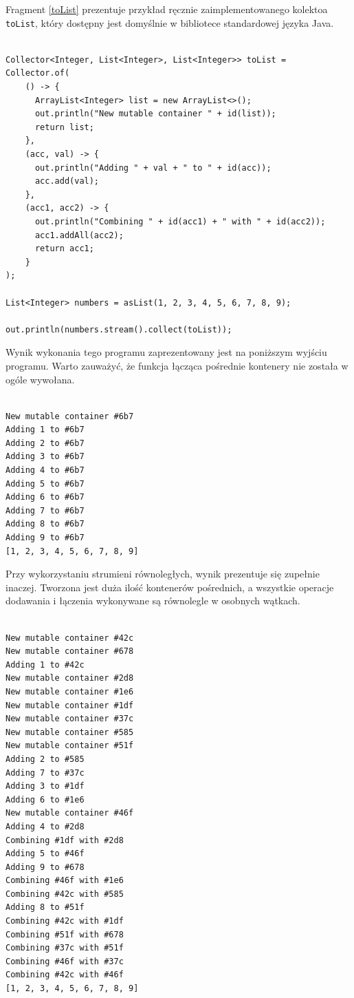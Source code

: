 \documentclass[12pt]{extarticle}
\begin{document}
    Fragment \ref{toList} prezentuje przykład ręcznie zaimplementowanego kolektoa \texttt{toList}, który dostępny jest domyślnie w bibliotece standardowej języka Java. 

\begin{lstlisting}[label=toList, caption=Ręczna implementacja \texttt{toList}]

Collector<Integer, List<Integer>, List<Integer>> toList = Collector.of(
    () -> {
      ArrayList<Integer> list = new ArrayList<>();
      out.println("New mutable container " + id(list));
      return list;
    },
    (acc, val) -> {
      out.println("Adding " + val + " to " + id(acc));
      acc.add(val);
    },
    (acc1, acc2) -> {
      out.println("Combining " + id(acc1) + " with " + id(acc2));
      acc1.addAll(acc2);
      return acc1;
    }
);

List<Integer> numbers = asList(1, 2, 3, 4, 5, 6, 7, 8, 9);

out.println(numbers.stream().collect(toList));

\end{lstlisting}

Wynik wykonania tego programu zaprezentowany jest na poniższym wyjściu programu. Warto zauważyć, że funkcja łącząca pośrednie kontenery nie została w ogóle wywołana. 
    
\begin{verbatim}

New mutable container #6b7
Adding 1 to #6b7
Adding 2 to #6b7
Adding 3 to #6b7
Adding 4 to #6b7
Adding 5 to #6b7
Adding 6 to #6b7
Adding 7 to #6b7
Adding 8 to #6b7
Adding 9 to #6b7
[1, 2, 3, 4, 5, 6, 7, 8, 9]

\end{verbatim}

Przy wykorzystaniu strumieni równoległych, wynik prezentuje się zupełnie inaczej. Tworzona jest duża ilość kontenerów pośrednich, a wszystkie operacje dodawania i łączenia wykonywane są równolegle w osobnych wątkach.

\begin{verbatim}

New mutable container #42c
New mutable container #678
Adding 1 to #42c
New mutable container #2d8
New mutable container #1e6
New mutable container #1df
New mutable container #37c
New mutable container #585
New mutable container #51f
Adding 2 to #585
Adding 7 to #37c
Adding 3 to #1df
Adding 6 to #1e6
New mutable container #46f
Adding 4 to #2d8
Combining #1df with #2d8
Adding 5 to #46f
Adding 9 to #678
Combining #46f with #1e6
Combining #42c with #585
Adding 8 to #51f
Combining #42c with #1df
Combining #51f with #678
Combining #37c with #51f
Combining #46f with #37c
Combining #42c with #46f
[1, 2, 3, 4, 5, 6, 7, 8, 9]

\end{verbatim}
\end{document}
